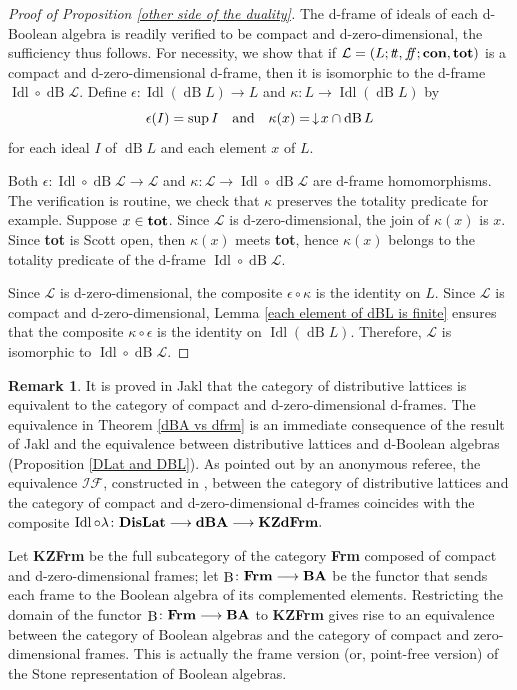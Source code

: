 \documentclass[11pt]{article}
\DeclareMathOperator{\idl}{Idl}
\DeclareMathOperator{\dB}{dB}
\DeclareMathOperator{\Ba}{B}
\theoremstyle{plain}
\theoremstyle{definition}
\newtheorem{rem}[thm]{Remark}
\newcommand{\dbt}{{t\!t}}
\newcommand{\dbf}{{f\!\!f}}
\newcommand{\dBoo}{\bf dBA}
\newcommand{\lra}{\longrightarrow}
\begin{document}
\begin{proof}[Proof of Proposition \ref{other side of the duality}]  The d-frame of ideals of each d-Boolean algebra is readily verified to be compact and d-zero-dimensional, the sufficiency thus follows. For necessity, we show that if  $\mathcal{L}=(L;\dbt,\dbf;{\bf con},{\bf tot})$ is a compact and d-zero-dimensional d-frame, then it is isomorphic to  the d-frame $ \idl\circ\dB \mathcal{L}$. Define $\epsilon\colon\idl(\dB L)\longrightarrow L$ and $\kappa\colon L\lra \idl(\dB L)$ by $$\epsilon(I)=\sup I  \quad \text{and}\quad \kappa(x) = \thinspace\downarrow\!x  \cap\dB L  $$ for each ideal $I$ of $\dB L$ and each element $x$ of $L$. 

Both   $\epsilon\colon \idl\circ\dB  \mathcal{L}  \longrightarrow \mathcal{L} $ and $\kappa\colon  \mathcal{L}\lra \idl\circ\dB  \mathcal{L} $ are d-frame homomorphisms. The verification is routine,  we  check that $\kappa$ preserves the totality predicate  for example. Suppose $x\in{\bf tot}$. Since $\mathcal{L}$ is d-zero-dimensional, the join of $\kappa(x)$ is $x$.  Since {\bf tot} is Scott open, then $\kappa(x)$ meets {\bf tot}, hence $\kappa(x)$ belongs to the totality predicate of the d-frame $ \idl\circ\dB \mathcal{L}$. 

Since $\mathcal{L}$ is d-zero-dimensional,  the composite $\epsilon\circ\kappa$ is the identity on $L$. Since $\mathcal{L}$ is compact and d-zero-dimensional, Lemma \ref{each element of dBL is finite} ensures that the composite $\kappa\circ\epsilon$ is the identity on $\idl(\dB L)$. Therefore, $\mathcal{L}$ is isomorphic to  $\idl\circ\dB \mathcal{L}$. 
\end{proof}

\begin{rem}   
It is proved in Jakl \cite[Section  2.6]{Jakl} that the category of distributive lattices is equivalent to the category of compact and d-zero-dimensional d-frames. 
The equivalence in Theorem \ref{dBA vs dfrm} is an immediate consequence of the result of Jakl and the equivalence between distributive lattices and d-Boolean algebras (Proposition \ref{DLat and DBL}). As pointed out by an anonymous referee, the equivalence   $\mathcal{IF}$, constructed in \cite[Section  2.6]{Jakl}, between the category of distributive lattices and the category of compact and d-zero-dimensional d-frames coincides with the composite   $\idl\circ\lambda\colon {\bf DisLat} \lra \dBoo \lra{\bf KZdFrm}.$   \end{rem}
 

Let {\bf KZFrm} be the full subcategory of the category {\bf Frm}  composed of compact and d-zero-dimensional frames; let $\Ba\colon {\bf Frm}\lra{\bf BA}$ be the functor that sends each frame to the Boolean algebra of its complemented elements. Restricting the  domain of the functor $\Ba\colon {\bf Frm}\lra{\bf BA}$ to {\bf KZFrm} gives rise to an equivalence between the category of Boolean algebras and the category of compact and zero-dimensional frames. This is actually the frame version (or, point-free version) of the Stone representation of Boolean algebras. 
 
\end{document}
